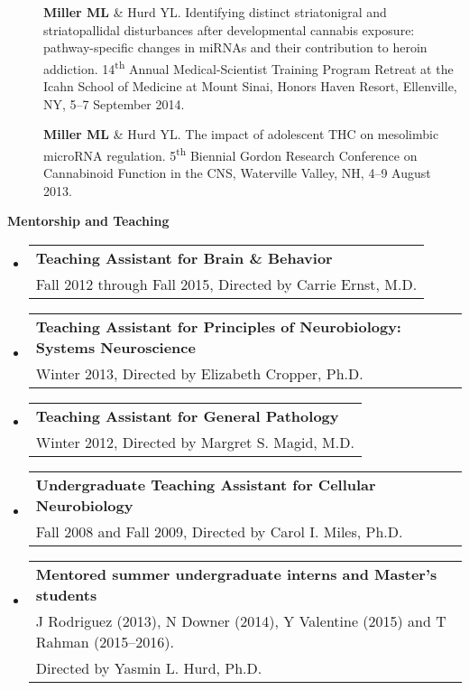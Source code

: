 \documentclass[10pt]{article}
\begin{document}
\begin{description}
\item[\quad] \textbf{Miller ML} \& Hurd YL. Identifying distinct striatonigral and striatopallidal disturbances after developmental cannabis exposure: pathway-specific changes in miRNAs and their contribution to heroin addiction. 14\textsuperscript{th} Annual Medical-Scientist Training Program Retreat at the Icahn School of Medicine at Mount Sinai, Honors Haven Resort, Ellenville, NY, 5--7 September 2014.

\item[\quad] \textbf{Miller ML} \& Hurd YL. The impact of adolescent THC on mesolimbic microRNA regulation. 5\textsuperscript{th} Biennial Gordon Research Conference on Cannabinoid Function in the CNS, Waterville Valley, NH, 4--9 August 2013.
\end{description}

\vspace{0.1in}
{\large \textbf{Mentorship and Teaching}}

\begin{itemize}

\item
  \begin{tabular*}{6.5in}{l}
    \textbf{Teaching Assistant for Brain \& Behavior} \\
    Fall 2012 through Fall 2015, Directed by Carrie Ernst, M.D. \\
  \end{tabular*}
\item
  \begin{tabular*}{6.5in}{l}
    \textbf{Teaching Assistant for Principles of Neurobiology: Systems Neuroscience} \\
    Winter 2013, Directed by Elizabeth Cropper, Ph.D. \\
  \end{tabular*}
\item
  \begin{tabular*}{6.5in}{l}
    \textbf{Teaching Assistant for General Pathology} \\
    Winter 2012, Directed by Margret S. Magid, M.D. \\
  \end{tabular*}
\item
  \begin{tabular*}{6.5in}{l}
    \textbf{Undergraduate Teaching Assistant for Cellular Neurobiology} \\
    Fall 2008 and Fall 2009, Directed by Carol I. Miles, Ph.D. \\
  \end{tabular*}  
\item
  \begin{tabular*}{6.5in}{l}
    \textbf{Mentored summer undergraduate interns and Master's students} \\
    J Rodriguez (2013), N Downer (2014), Y Valentine (2015) and T Rahman (2015--2016).\\
    Directed by Yasmin L. Hurd, Ph.D. \\
  \end{tabular*}  
\end{itemize}
\end{document}

